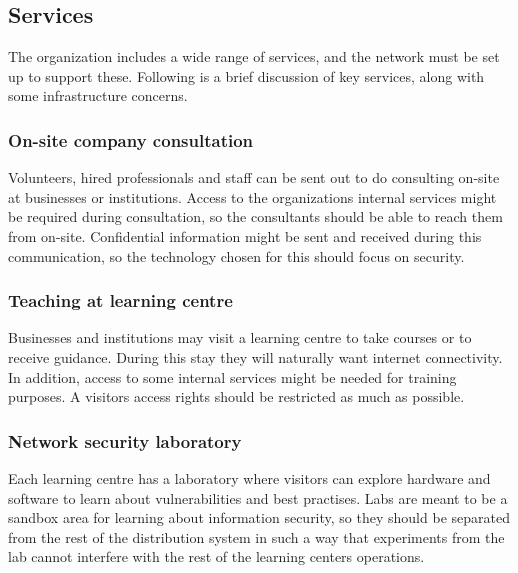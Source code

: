 \subsection{Services}

The organization includes a wide range of services, and the network must be set up to support these. Following is a brief discussion of key services, along with some infrastructure concerns.


\subsubsection{On-site company consultation}

Volunteers, hired professionals and staff  can be sent out to do consulting on-site at businesses or institutions. Access to the organizations internal services might be required during consultation, so the consultants should be able to reach them from on-site. Confidential information might be sent and received during this communication, so the technology chosen for this should focus on security.

\subsubsection{Teaching at learning centre}

Businesses and institutions may visit a learning centre to take courses or to receive guidance. During this stay they will naturally want internet connectivity. In addition, access to some internal services might be needed for training purposes. A visitors access rights should be restricted as much as possible.

\subsubsection{Network security laboratory}

Each learning centre has a laboratory where visitors can explore hardware and software to learn about vulnerabilities and best practises. Labs are meant to be a sandbox area for learning about information security, so they should be separated from the rest of the distribution system in such a way that experiments from the lab cannot interfere with the rest of the learning centers operations.


